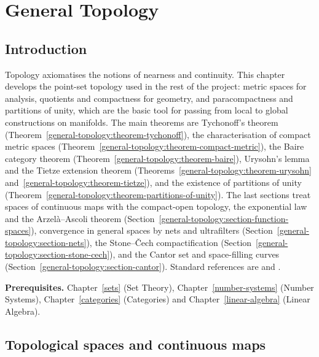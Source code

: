 \chapter{General Topology}\label{general-topology}

\section{Introduction}\label{general-topology:section-introduction}

Topology axiomatises the notions of nearness and continuity. This chapter develops the point-set topology used in
the rest of the project: metric spaces for analysis, quotients and compactness for geometry, and paracompactness and
partitions of unity, which are the basic tool for passing from local to global constructions on manifolds. The main
theorems are Tychonoff's theorem (Theorem~\ref{general-topology:theorem-tychonoff}), the characterisation of compact
metric spaces (Theorem~\ref{general-topology:theorem-compact-metric}), the Baire category theorem
(Theorem~\ref{general-topology:theorem-baire}), Urysohn's lemma and the Tietze extension theorem
(Theorems~\ref{general-topology:theorem-urysohn} and~\ref{general-topology:theorem-tietze}), and the existence of
partitions of unity (Theorem~\ref{general-topology:theorem-partitions-of-unity}). The last sections treat spaces of continuous maps with the compact-open topology, the exponential law and the Arzel\`a--Ascoli
theorem (Section~\ref{general-topology:section-function-spaces}), convergence in general spaces by nets and
ultrafilters (Section~\ref{general-topology:section-nets}), the Stone--\v{C}ech compactification (Section~\ref{general-topology:section-stone-cech}), and the Cantor set
and space-filling curves (Section~\ref{general-topology:section-cantor}). Standard references are
\cite{munkres-topology} and \cite{engelking-general-topology}.

\noindent\textbf{Prerequisites.} Chapter~\ref{sets} (Set Theory), Chapter~\ref{number-systems} (Number Systems),
Chapter~\ref{categories} (Categories) and Chapter~\ref{linear-algebra} (Linear Algebra).

\section{Topological spaces and continuous maps}\label{general-topology:section-spaces}

